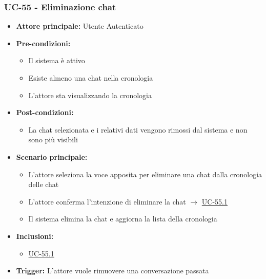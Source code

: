 \documentclass[a4paper,12pt]{article}
\begin{document}
\subsubsection{UC-55 - Eliminazione chat} \label{subsec:UC-55}
\begin{itemize}
    \item \textbf{Attore principale:} Utente Autenticato
    \item \textbf{Pre-condizioni:}
    \begin{itemize}
        \item Il sistema è attivo
        \item Esiste almeno una chat nella cronologia
        \item L'attore sta visualizzando la cronologia
    \end{itemize}
    \item \textbf{Post-condizioni:} 
    \begin{itemize}
        \item La chat selezionata e i relativi dati vengono rimossi dal sistema e non sono più visibili
    \end{itemize}
    \item \textbf{Scenario principale:} 
    \begin{itemize}
        \item L'attore seleziona la voce apposita per eliminare una chat dalla cronologia delle chat
        \item L'attore conferma l'intenzione di eliminare la chat $\rightarrow$ \hyperref[subsec:UC-55.1]{UC-55.1}
        \item Il sistema elimina la chat e aggiorna la lista della cronologia
    \end{itemize}
    \item \textbf{Inclusioni:} 
    \begin{itemize}
        \item \hyperref[subsec:UC-55.1]{UC-55.1}
    \end{itemize}
    \item \textbf{Trigger:} L'attore vuole rimuovere una conversazione passata
\end{itemize}
\end{document}
